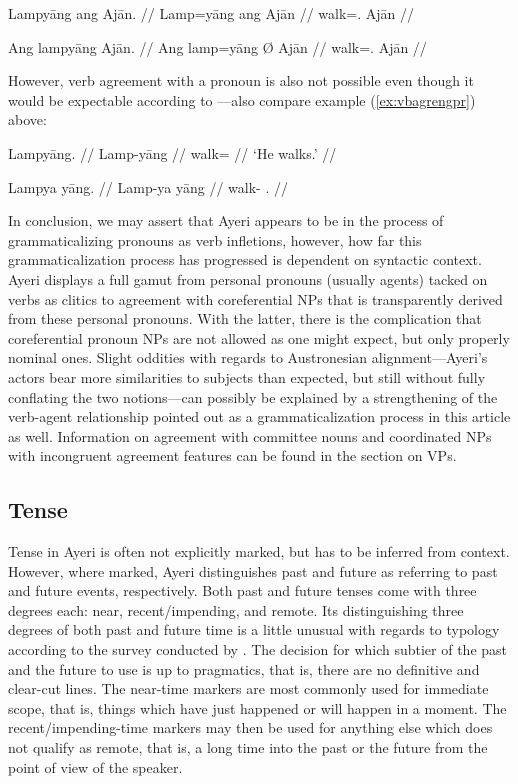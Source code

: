 \pex %
\a\ljudge* \begingl
	\gla Lampyāng ang Ajān. //
	\glb Lamp=yāng ang ​Ajān //
	\glc walk=\TsgM{}.\Aarg{} \Aarg{} Ajān //
\endgl

\a\ljudge* \begingl	
	\gla Ang lampyāng {} Ajān. //
	\glb Ang lamp=yāng Ø ​Ajān //
	\glc \AgtT{} walk=\TsgM{}.\Aarg{} \Top{} ​Ajān //
\endgl

\xe

However, verb agreement with a pronoun is also not possible even though it 
would be expectable according to \citep[109]{corbett2006}---also compare 
example (\ref{ex:vbagrengpr}) above:

\pex %
\a\begingl
	\gla Lampyāng. //
	\glb Lamp-yāng //
	\glc walk=\TsgM{} //
	\glft `He walks.' //
\endgl

\a\ljudge* \begingl	
	\gla Lampya yāng. //
	\glb Lamp-ya yāng //
	\glc walk-\TsgM{} \TsgM{}.\Aarg{} //
\endgl

\xe

In conclusion, we may assert that Ayeri appears to be in the process of 
grammaticalizing pronouns as verb infletions, however, how far this 
grammaticalization process has progressed is dependent on syntactic context. 
Ayeri displays a full gamut from personal pronouns (usually agents) tacked on 
verbs as clitics to agreement with coreferential NPs that is transparently 
derived from these personal pronouns. With the latter, there is the 
complication that coreferential pronoun NPs are not allowed as one might 
expect, but only properly nominal ones. Slight oddities with regards to 
Austronesian alignment---Ayeri's actors bear more similarities to subjects than 
expected, but still without fully conflating the two notions---can possibly be 
explained by a strengthening of the verb-agent relationship pointed out as a 
grammaticalization process in this article as well. Information on agreement 
with committee nouns and coordinated NPs with incongruent agreement features 
can be found in the section on VPs.


\subsection{Tense}

Tense in Ayeri is often not explicitly marked, but has to be inferred from 
context. However, where marked, Ayeri distinguishes past and future as 
referring to past and future events, respectively. Both past and future 
tenses come with three degrees each: near, recent/impending, and remote. 
Its distinguishing three degrees of both past and future time is a little 
unusual with regards to typology according to the survey conducted by 
\citet[127]{dahl1985}. The decision for which subtier of the past and the 
future to use is up to pragmatics, that is, there are no definitive 
and clear-cut lines. The near-time markers are most commonly used for 
immediate scope, that is, things which have just happened or will happen in a 
moment. The recent/impending-time markers may then be used for anything else 
which does not qualify as remote, that is, a long time into the past or the 
future from the point of view of the speaker.

